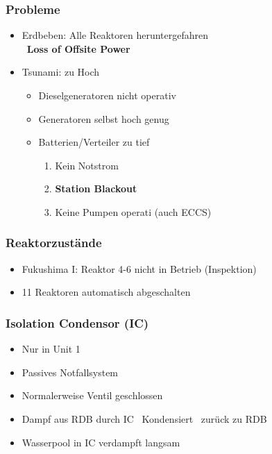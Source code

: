 \documentclass[12pt]{article}
\begin{document}
\subsubsection{Probleme}
\begin{itemize}
	\item Erdbeben: Alle Reaktoren heruntergefahren\\
		\textrightarrow\ \textbf{Loss of Offsite Power}
	\item Tsunami: zu Hoch
		\begin{itemize}
			\item Dieselgeneratoren nicht operativ
			\item Generatoren selbst hoch genug
			\item Batterien/Verteiler zu tief
				\begin{enumerate}[label = \textrightarrow]
					\item Kein Notstrom
					\item \textbf{Station Blackout}
					\item Keine Pumpen operati (auch ECCS)
				\end{enumerate}
		\end{itemize}
\end{itemize}

\subsubsection{Reaktorzustände}
\begin{itemize}
	\item Fukushima I: Reaktor 4-6 nicht in Betrieb (Inspektion)
	\item 11 Reaktoren automatisch abgeschalten
\end{itemize}

\subsubsection{Isolation Condensor (IC)}
\begin{itemize}
	\item Nur in Unit 1
	\item Passives Notfallsystem
	\item Normalerweise Ventil geschlossen
	\item Dampf aus RDB durch IC \textrightarrow\ Kondensiert \textrightarrow\ zurück zu RDB
	\item Wasserpool in IC verdampft langsam
\end{itemize}
\end{document}
